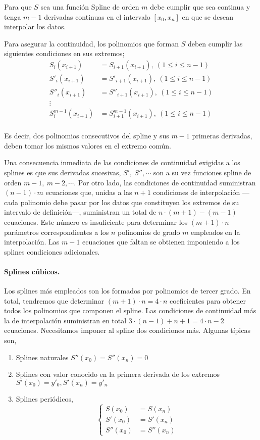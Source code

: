 Para que $S$ sea una función Spline de orden $m$ debe cumplir que sea continua y tenga $m-1$ derivadas continuas en el intervalo $[x_0,x_n]$ en que se desean interpolar los datos.
   
Para asegurar la continuidad, los polinomios que forman $S$ deben cumplir las siguientes condiciones en sus extremos;
\begin{align*}
S_i(x_{i+1})&=S_{i+1}(x_{i+1}),\ (1\leq i \leq n-1)\\
S'_i(x_{i+1})&=S'_{i+1}(x_{i+1}),\ (1\leq i \leq n-1)\\
S''_i(x_{i+1})&=S''_{i+1}(x_{i+1}),\ (1\leq i \leq n-1)\\
\vdots \\
S^{m-1}_i(x_{i+1})&=S^{m-1}_{i+1}(x_{i+1}),\ (1\leq i \leq n-1)\\
\end{align*}

Es decir, dos polinomios consecutivos del spline y sus $m-1$ primeras derivadas, deben tomar los mismos valores en el extremo común. 

Una consecuencia inmediata de las condiciones de continuidad exigidas a los splines es que sus derivadas sucesivas, $S',\ S'', \cdots$ son a su vez funciones spline de orden $m-1,\ m-2, \cdots$. Por otro lado, las condiciones de continuidad suministran  $(n-1)\cdot m$ ecuaciones que, unidas a las $n+1$ condiciones de interpolación ---cada polinomio debe pasar por los datos que constituyen los extremos de su intervalo de definición---,  suministran un total de  $n\cdot (m+1)-(m-1)$ ecuaciones. Este número es insuficiente para determinar los $(m+1)\cdot n$ parámetros correspondientes a los $n$ polinomios de grado $m$ empleados en la interpolación. Las $m-1$ ecuaciones que faltan se obtienen imponiendo a los splines condiciones adicionales.


\paragraph{Splines cúbicos.}  Los splines más empleados son los formados por polinomios de tercer grado. En total, tendremos que determinar $(m+1)\cdot n=4\cdot n$ coeficientes para obtener todos los polinomios que componen el spline. Las condiciones de continuidad más la de interpolación suministran en total $3\cdot (n-1)+n+1=4\cdot n-2$  ecuaciones. Necesitamos imponer al spline dos condiciones más. Algunas típicas son,
\begin{enumerate}
\item Splines naturales $S''(x_0)=S''(x_n)=0$
\item Splines con valor conocido en la primera derivada de los extremos $S'(x_0)=y'_0, S'(x_n)=y'_n$
\item Splines periódicos,
\begin{equation*}
\left\{ 
\begin{aligned}
S(x_0)&=S(x_n)\\
S'(x_0)&=S'(x_n)\\
S''(x_0)&=S''(x_n)
\end{aligned}
\right.
\end{equation*}
\end{enumerate}

